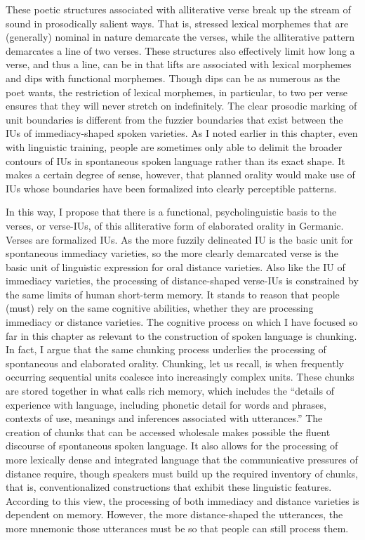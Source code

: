 These poetic structures associated with alliterative verse break up the stream of sound in prosodically salient ways. That is, stressed lexical morphemes that are (generally) nominal in nature demarcate the verses, while the alliterative pattern demarcates a line of two verses. These structures also effectively limit how long a verse, and thus a line, can be in that lifts are associated with lexical morphemes and dips with functional morphemes. Though dips can be as numerous as the poet wants, the restriction of lexical morphemes, in particular, to two per verse ensures that they will never stretch on indefinitely. The clear prosodic marking of unit boundaries is different from the fuzzier boundaries that exist between the IUs of immediacy-shaped spoken varieties. As I noted earlier in this chapter, even with linguistic training, people are sometimes only able to delimit the broader contours of IUs in spontaneous spoken language rather than its exact shape. It makes a certain degree of sense, however, that planned orality would make use of IUs whose boundaries have been formalized into clearly perceptible patterns.

In this way, I propose that there is a functional, psycholinguistic basis to the verses, or verse-IUs, of this alliterative form of elaborated orality in Germanic. Verses are formalized IUs. As the more fuzzily delineated IU is the basic unit for spontaneous immediacy varieties, so the more clearly demarcated verse is the basic unit of linguistic expression for oral distance varieties. Also like the IU of immediacy varieties, the processing of distance-shaped verse-IUs is constrained by the same limits of human short-term memory. It stands to reason that people (must) rely on the same cognitive abilities, whether they are processing immediacy or distance varieties. The cognitive process on which I have focused so far in this chapter as relevant to the construction of spoken language is chunking. In fact, I argue that the same chunking process underlies the processing of spontaneous and elaborated orality. Chunking, let us recall, is when frequently occurring sequential units coalesce into increasingly complex units. These chunks are stored together in what \citet[7]{Bybee2010} calls rich memory, which includes the “details of experience with language, including phonetic detail for words and phrases, contexts of use, meanings and inferences associated with utterances.” The creation of chunks that can be accessed wholesale makes possible the fluent discourse of spontaneous spoken language. It also allows for the processing of more lexically dense and integrated language that the communicative pressures of distance require, though speakers must build up the required inventory of chunks, that is, conventionalized constructions that exhibit these linguistic features. According to this view, the processing of both immediacy and distance varieties is dependent on memory. However, the more distance-shaped the utterances, the more mnemonic those utterances must be so that people can still process them.

